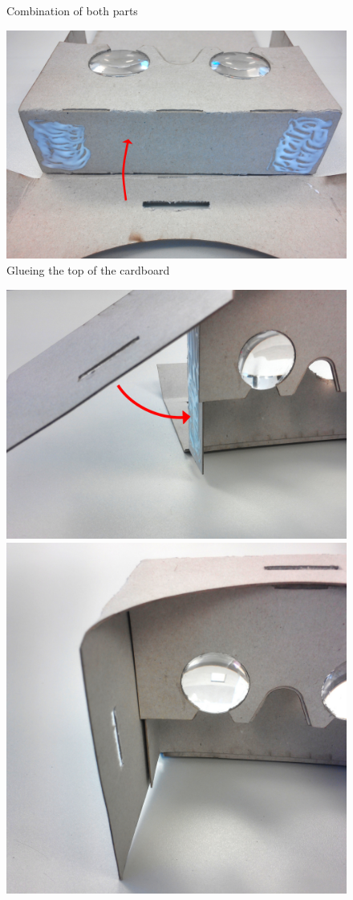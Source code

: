 \documentclass[../../Cardboard_Assembling]{subfiles}
\begin{document}
\begin{enumerate}
\begin{figure}[htb]
		\caption{Combination of both parts}
		\label{fig:screenshot018}
	\end{figure}
	\begin{figure}[htb]
	\centering
		\includegraphics[width=0.7\linewidth]{partE04}
		\caption{Glueing the top of the cardboard}
		\label{fig:screenshot019}
	\end{figure}	
	\begin{figure}[htb]
		\centering
		\includegraphics[width=0.6\linewidth]{partE05}\\ \vspace{2mm}
		\includegraphics[width=0.6\linewidth]{partE06}

\end{figure}
\end{enumerate}
\end{document}
